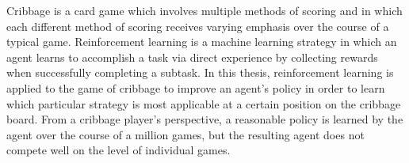 

Cribbage is a card game which involves multiple methods of scoring
and in which each different method of scoring receives varying emphasis
over the course of a typical game.
%
Reinforcement learning is a machine learning strategy in which an agent learns
to accomplish a task via direct experience
by collecting rewards when successfully completing a subtask.
%
In this thesis,
reinforcement learning is applied to the game of cribbage
to improve an agent's policy
in order to learn which particular strategy is most applicable at a certain
position on the cribbage board.
%
From a cribbage player's perspective,
a reasonable policy is learned by the agent over the course of a million games,
but the resulting agent does not compete well on the level of individual games.
